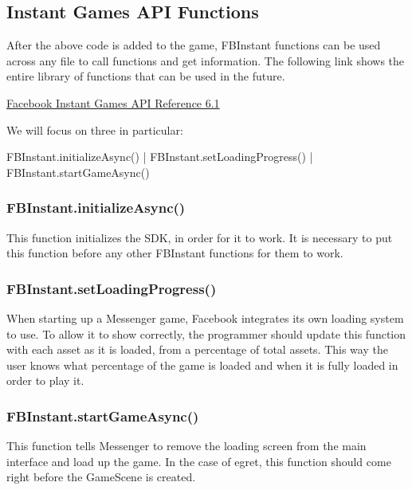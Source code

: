 \documentclass{article}
\begin{document}
\newpage

\subsection{Instant Games API Functions}
After the above code is added to the game, FBInstant functions can be used across any file to call functions and get information. The following link shows the entire library of functions that can be used in the future.

\vspace{.5cm}
\href{https://developers.facebook.com/docs/games/instant-games/sdk/fbinstant6.1}{Facebook Instant Games API Reference 6.1}
\vspace{.5cm}

We will focus on three in particular:

FBInstant.initializeAsync() | FBInstant.setLoadingProgress() | FBInstant.startGameAsync()

\subsubsection{FBInstant.initializeAsync()}
This function initializes the SDK, in order for it to work. It is necessary to put this function before any other FBInstant functions for them to work.

\subsubsection{FBInstant.setLoadingProgress()}
When starting up a Messenger game, Facebook integrates its own loading system to use. To allow it to show correctly, the programmer should update this function with each asset as it is loaded, from a percentage of total assets. This way the user knows what percentage of the game is loaded and when it is fully loaded in order to play it.

\subsubsection{FBInstant.startGameAsync()}
This function tells Messenger to remove the loading screen from the main interface and load up the game. In the case of egret, this function should come right before the GameScene is created.
\end{document}
